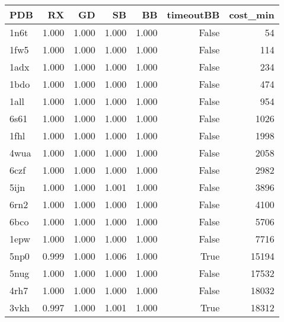 \begin{tabular}{lrrrrrr}
\toprule
PDB & RX & GD & SB & BB & timeoutBB & cost_min \\
\midrule
1n6t & 1.000 & 1.000 & 1.000 & 1.000 & False & 54 \\
1fw5 & 1.000 & 1.000 & 1.000 & 1.000 & False & 114 \\
1adx & 1.000 & 1.000 & 1.000 & 1.000 & False & 234 \\
1bdo & 1.000 & 1.000 & 1.000 & 1.000 & False & 474 \\
1all & 1.000 & 1.000 & 1.000 & 1.000 & False & 954 \\
6s61 & 1.000 & 1.000 & 1.000 & 1.000 & False & 1026 \\
1fhl & 1.000 & 1.000 & 1.000 & 1.000 & False & 1998 \\
4wua & 1.000 & 1.000 & 1.000 & 1.000 & False & 2058 \\
6czf & 1.000 & 1.000 & 1.000 & 1.000 & False & 2982 \\
5ijn & 1.000 & 1.000 & 1.001 & 1.000 & False & 3896 \\
6rn2 & 1.000 & 1.000 & 1.000 & 1.000 & False & 4100 \\
6bco & 1.000 & 1.000 & 1.000 & 1.000 & False & 5706 \\
1epw & 1.000 & 1.000 & 1.000 & 1.000 & False & 7716 \\
5np0 & 0.999 & 1.000 & 1.006 & 1.000 & True & 15194 \\
5nug & 1.000 & 1.000 & 1.000 & 1.000 & False & 17532 \\
4rh7 & 1.000 & 1.000 & 1.000 & 1.000 & False & 18032 \\
3vkh & 0.997 & 1.000 & 1.001 & 1.000 & True & 18312 \\ 
\bottomrule
\end{tabular}
